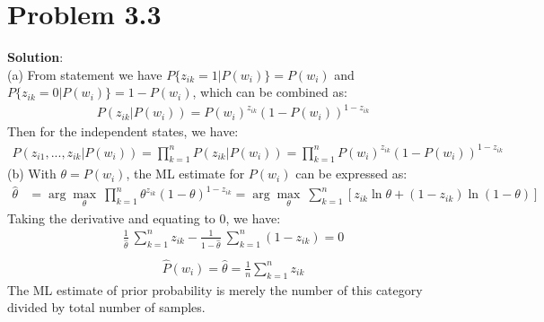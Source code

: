 \documentclass[12pt]{article}
\begin{document}
\section{Problem 3.3}
\large{\textbf{Solution}}: \\
(a) From statement we have $P\{z_{ik}=1|P(w_i)\}=P(w_i)$ and $P\{z_{ik}=0|P(w_i)\}=1-P(w_i)$, which can be combined as:
\begin{equation*}
\begin{aligned}
P(z_{ik}|P(w_i))=P(w_i)^{z_{ik}}(1-P(w_i))^{1-z_{ik}}
\end{aligned}
\end{equation*}
Then for the independent states, we have:
\begin{equation*}
\begin{aligned}
P(z_{i1},...,z_{ik}|P(w_i))=\prod^n_{k=1}P(z_{ik}|P(w_i))=\prod^n_{k=1}P(w_i)^{z_{ik}}(1-P(w_i))^{1-z_{ik}}
\end{aligned}
\end{equation*}
(b) With $\theta = P(w_i)$, the ML estimate for $P(w_i)$ can be expressed as:
\begin{equation*}
\begin{aligned}
\hat{\theta} &= \arg\max_{\theta}\ \prod^n_{k=1}\theta^{z_{ik}}(1-\theta)^{1-z_{ik}} =\arg\max_{\theta}\ \sum_{k=1}^{n} [z_{ik}\ln\theta+(1-z_{ik})\ln(1-\theta)]
\end{aligned}
\end{equation*}
Taking the derivative and equating to 0, we have:
\begin{equation*}
\begin{aligned}
\frac{1}{\hat{\theta}}\ \sum_{k=1}^{n} z_{ik} - \frac{1}{1-\hat{\theta}}\ \sum_{k=1}^{n} (1-z_{ik}) = 0\\
\end{aligned}
\end{equation*}
\begin{equation*}
\begin{aligned}
\hat{P}(w_i)=\hat{\theta} = \frac{1}{n}\sum_{k=1}^{n} z_{ik}
\end{aligned}
\end{equation*}
The ML estimate of prior probability is merely the number of this category divided by total number of samples.
\vfill
\clearpage
\end{document}
